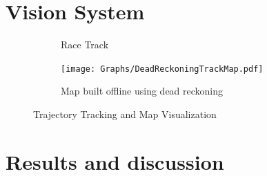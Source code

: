     \section{Vision System}
    \begin{figure}[H]
        \centering
        \begin{subfigure}[c]{0.35\textwidth}  %
            \centering
            \caption{Race Track}
        \end{subfigure}
       
        \hspace{0.05cm}  %
        \begin{subfigure}[c]{0.6\textwidth}  %
            \centering
            \texttt{[image: Graphs/DeadReckoningTrackMap.pdf]}
            \caption{Map built offline using dead reckoning}
        \end{subfigure}
        \caption{Trajectory Tracking and Map Visualization}
    \end{figure}
    
    
    \pagebreak{}


  \section{Results and discussion} %
